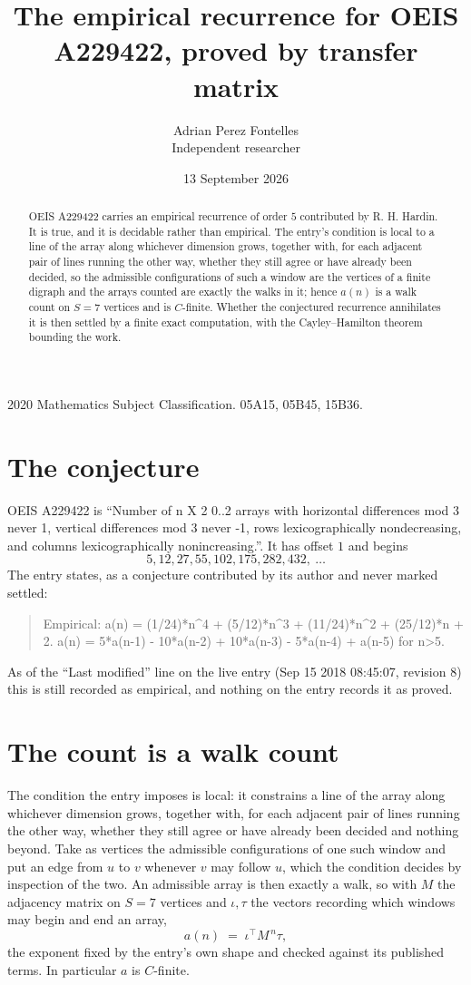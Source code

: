 \documentclass[11pt,a4paper]{article}
\title{The empirical recurrence for OEIS A229422, proved by transfer matrix}
\author{Adrian Perez Fontelles\\ \small Independent researcher}
\date{13 September 2026}
\theoremstyle{plain}
\theoremstyle{definition}
\begin{document}
\maketitle

\begin{abstract}
OEIS A229422 carries an empirical recurrence of order $5$ contributed by R. H. Hardin. It is
true, and it is decidable rather than empirical. The entry's condition is local to a line of the array along whichever dimension grows, together with, for each adjacent pair of lines running the other way, whether they still agree or have already been decided, so
the admissible configurations of such a window are the vertices of a finite digraph and the
arrays counted are exactly the walks in it; hence $a(n)$ is a walk count on $S=7$ vertices
and is $C$-finite. Whether the conjectured recurrence annihilates it is then settled by a
finite exact computation, with the Cayley--Hamilton theorem bounding the work.
\end{abstract}

\noindent\small 2020 Mathematics Subject Classification. 05A15, 05B45, 15B36.\normalsize

\section{The conjecture}

OEIS A229422 is ``Number of n X 2 0..2 arrays with horizontal differences mod 3 never 1, vertical differences mod 3 never -1, rows lexicographically nondecreasing, and columns lexicographically nonincreasing.''. It has offset $1$ and begins
\[
5, 12, 27, 55, 102, 175, 282, 432,\ \dots
\]
The entry states, as a conjecture contributed by its author and never marked settled:
\begin{quote}
Empirical: a(n) = (1/24)*n\^{}4 + (5/12)*n\^{}3 + (11/24)*n\^{}2 + (25/12)*n + 2. a(n) = 5*a(n-1) - 10*a(n-2) + 10*a(n-3) - 5*a(n-4) + a(n-5) for n>5.
\end{quote}
As of the ``Last modified'' line on the live entry (Sep 15 2018 08:45:07, revision 8) this is still
recorded as empirical, and nothing on the entry records it as proved.

\section{The count is a walk count}

The condition the entry imposes is local: it constrains a line of the array along whichever dimension grows, together with, for each adjacent pair of lines running the other way, whether they still agree or have already been decided and nothing beyond. Take as
vertices the admissible configurations of one such window and put an edge from $u$ to $v$
whenever $v$ may follow $u$, which the condition decides by inspection of the two. An
admissible array is then exactly a walk, so with $M$ the adjacency matrix on $S=7$ vertices
and $\iota,\tau$ the vectors recording which windows may begin and end an array,
\[
a(n)\;=\;\iota^{\!\top}M^{\,n}\tau ,
\]
the exponent fixed by the entry's own shape and checked against its published terms. In
particular $a$ is $C$-finite.
\end{document}
